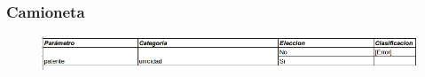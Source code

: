 \subsubsection{Camioneta}

\begin{figure}[H]
   \begin{center}
   \includegraphics[scale=0.6]{graphics/camioneta.png}
   \label{fig:der}
   \end{center}
\end{figure}